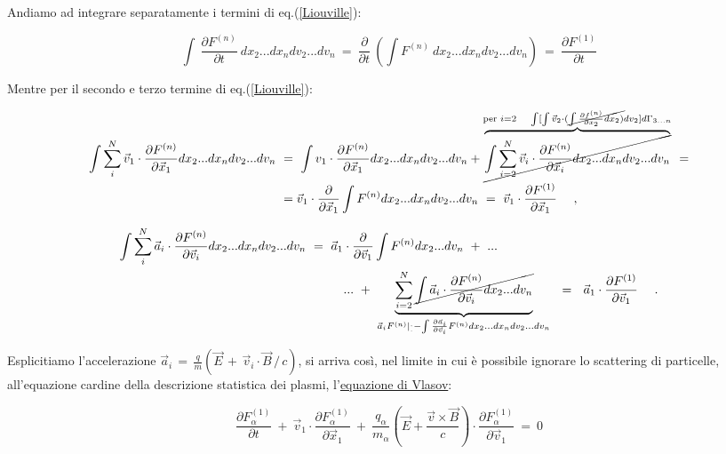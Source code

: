 Andiamo ad integrare separatamente i termini di eq.(\ref{Liouville}):

\[ \int\ \frac{\partial F^{(n)}}{\partial t}\ dx_2 ...dx_n dv_2 ...dv_n\ =\ \frac{\partial}{\partial t }\ \left( \int F^{(n)}\ dx_2 ...dx_n dv_2 ...dv_n\right)\ =\ \frac{\partial F^{(1)}}{\partial t}\]

Mentre per il secondo e terzo termine di eq.(\ref{Liouville}):

\[\begin{split} 
\int\sum^N_{i} \vec v_1 \cdot \frac{\partial F^{(n)}}{\partial \vec x_1} dx_2 ...dx_n dv_2 ...dv_n\ 
&=\ \int v_1 \cdot \frac{\partial F^{(n)}}{\partial \vec x_1 } dx_2 ...dx_n dv_2 ...dv_n + 
\overset{\text{per }i=2\ \ \ \int [\int \vec v_2 \cdot(\cancel{\int \frac{\partial f^{(n)}}{\partial x_2}dx_2)}dv_2]d\Gamma_{3...n}}{\overbrace{\cancel{\int \sum^N_{i=2} \vec v_i \cdot \frac{\partial F^{(n)}}{\partial \vec x_i} dx_2 ...dx_n dv_2 ...dv_n}}} \ =\\ 
&= \vec v_1 \cdot \frac{\partial}{\partial \vec x_1} \int F^{(n)} dx_2 ...dx_n dv_2 ...dv_n \ =\ \vec v_1 \cdot \frac{\partial F^{(1)}}{\partial \vec x_1}\ \ \ \ ,
\end{split}\]

\[\begin{split} \int \sum^N_{i}\vec a_i \cdot \frac{\partial F^{(n)}}{\partial \vec v_i} dx_2 ...dx_n dv_2 ...dv_n\ 
&=\ \vec a_1\cdot \frac{\partial}{\partial \vec v_1} \int F^{(n)} dx_2 ... dv_n\ +\ ... \\
&\ \ \ \ \ \ \ \ ...\ +\ \underset{\vec a_i F^{(n)}|_.^. - \int \frac{\partial \vec a_i}{\partial\vec v_i} F^{(n)}dx_2\dots dx_n dv_2\dots dv_n }{\underbrace{\sum^N_{i=2}\cancel{\int \vec a_i \cdot \frac{\partial F^{(n)} }{\partial \vec v_i} dx_2 ...dv_n}}} \ 
\ =\ \ \vec a_1 \cdot \frac{\partial F^{(1)}}{\partial \vec v_1} \ \ \ \ .
\end{split}\]


Esplicitiamo l'accelerazione $\vec a_i\, =\, \frac{q}{m}(\vec E\,+\, \vec v_i\cdot \vec B\, /\, c )$, si arriva così, nel limite in cui è possibile ignorare lo scattering di particelle, all'equazione cardine della descrizione statistica dei plasmi, l'\underline{equazione di Vlasov}:

\begin{equation}\label{VLASOV}
	\boxed{\ \frac{\partial F^{(1)}_\alpha}{\partial t}\ +\ \vec v_1 \cdot \frac{\partial F^{(1)}_\alpha}{\partial \vec x_1}\ +\ \frac{q_\alpha}{m_\alpha}\left( \vec E + \frac{\vec v \times \vec B}{c}\right)\cdot\frac{\partial F^{(1)}_\alpha}{\partial \vec v_1}\ =\ 0\ }
\end{equation}

